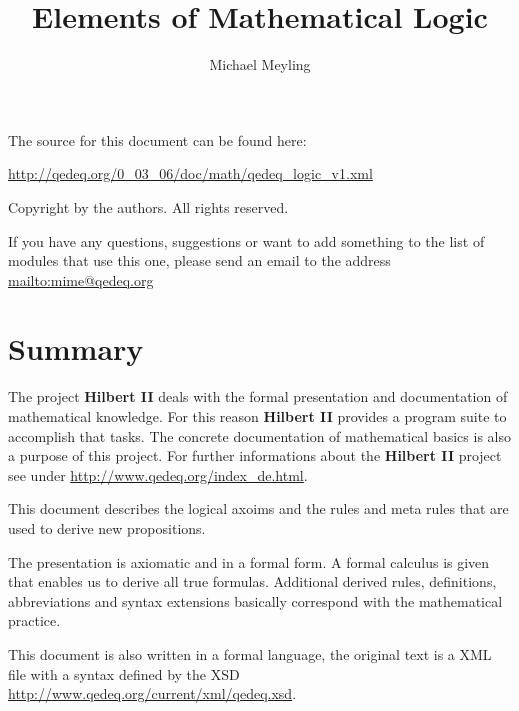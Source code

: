 \documentclass[a4paper,german,10pt,twoside]{book}
\title{Elements of Mathematical Logic}
\author{
Michael Meyling
}
\theoremstyle{definition}
\theoremstyle{remark}
\begin{document}
\maketitle

\setlength{\parskip}{5pt plus 2pt minus 1pt}
\mbox{}
\vfill

\par
The source for this document can be found here:
\par
\url{http://qedeq.org/0_03_06/doc/math/qedeq_logic_v1.xml}

\par
Copyright by the authors. All rights reserved.
\par
If you have any questions, suggestions or want to add something to the list of modules that use this one, please send an email to the address \url{mailto:mime@qedeq.org}

\setlength{\parskip}{0pt}
\tableofcontents

\setlength{\parskip}{5pt plus 2pt minus 1pt}

\chapter*{Summary} \label{chapter0} \hypertarget{chapter0}{}

The project \textbf{Hilbert II} deals with the formal presentation and documentation of
mathematical knowledge. For this reason \textbf{Hilbert II} provides a program suite to
accomplish that tasks. The concrete documentation of mathematical basics is also a purpose
of this project.   
For further informations about the \textbf{Hilbert II} project see under
\url{http://www.qedeq.org/index_de.html}.

\par
This document describes the logical axoims and the rules and meta rules that are used to
derive new propositions.

\par
The presentation is axiomatic and in a formal form. A formal calculus is given that enables
us to derive all true formulas. Additional derived rules, definitions, abbreviations and
syntax extensions basically correspond with the mathematical practice.

\par
This document is also written in a formal language, the original text is a XML file with a syntax
defined by the XSD \url{http://www.qedeq.org/current/xml/qedeq.xsd}.
\end{document}
